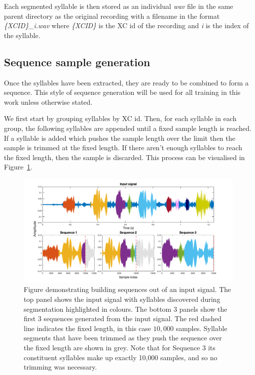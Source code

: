 Each segmented syllable is then stored as an individual \textit{wav} file in the
same parent directory as the original recording with a filename in the format
\textit{\{XCID\}\_i.wav} where \textit{\{XCID\}} is the XC id of the recording
and \textit{i} is the index of the syllable.

\subsection{Sequence sample generation}\label{ssec:sequence_gen}

Once the syllables have been extracted, they are ready to be combined to form a
sequence. This style of sequence generation will be used for all training in
this work unless otherwise stated.

We first start by grouping syllables by XC id. Then, for each syllable
in each group, the following syllables are appended until a fixed sample length
is reached. If a syllable is added which pushes the sample length over the
limit then the sample is trimmed at the fixed length. If there aren't enough
syllables to reach the fixed length, then the sample is discarded. This process
can be visualised in Figure~\ref{fig:sequence_building}.

\begin{figure}[ht]
  \centering
  \includegraphics[width=\textwidth]{figures/sequence_building_2.png}
  \caption{Figure demonstrating building sequences out of an input signal. The
    top panel shows the input signal with syllables discovered during
    segmentation highlighted in colours. The bottom 3 panels show the first 3
    sequences generated from the input signal. The red dashed line indicates the
    fixed length, in this case $10,000$ samples. Syllable segments that have
    been trimmed as they push the sequence over the fixed length are shown in
    grey. Note that for Sequence 3 its constituent syllables make up exactly
    10,000 samples, and so no trimming was
  necessary.}\label{fig:sequence_building}
\end{figure}

